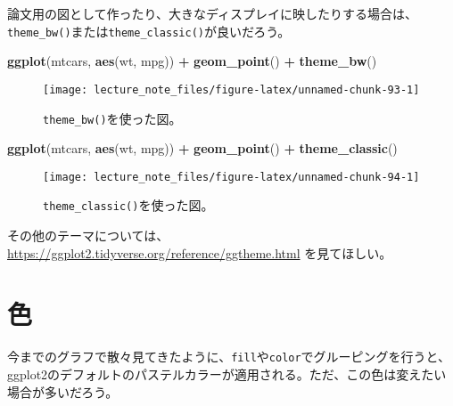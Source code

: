 \documentclass[]{book}
\newenvironment{Shaded}{\begin{snugshade}}{\end{snugshade}}
\newcommand{\KeywordTok}[1]{\textcolor[rgb]{0.13,0.29,0.53}{\textbf{#1}}}
\newcommand{\StringTok}[1]{\textcolor[rgb]{0.31,0.60,0.02}{#1}}
\newcommand{\OperatorTok}[1]{\textcolor[rgb]{0.81,0.36,0.00}{\textbf{#1}}}
\newcommand{\NormalTok}[1]{#1}
\begin{document}
論文用の図として作ったり、大きなディスプレイに映したりする場合は、\texttt{theme\_bw()}または\texttt{theme\_classic()}が良いだろう。



\begin{Shaded}
\begin{Highlighting}[]
\KeywordTok{ggplot}\NormalTok{(mtcars, }\KeywordTok{aes}\NormalTok{(wt, mpg)) }\OperatorTok{+}
\StringTok{  }\KeywordTok{geom_point}\NormalTok{() }\OperatorTok{+}
\StringTok{  }\KeywordTok{theme_bw}\NormalTok{()}
\end{Highlighting}
\end{Shaded}

\begin{figure}

{\centering \texttt{[image: lecture\_note\_files/figure-latex/unnamed-chunk-93-1]} 

}

\caption{\texttt{theme\_bw()}を使った図。}\label{fig:unnamed-chunk-93}
\end{figure}



\begin{Shaded}
\begin{Highlighting}[]
\KeywordTok{ggplot}\NormalTok{(mtcars, }\KeywordTok{aes}\NormalTok{(wt, mpg)) }\OperatorTok{+}
\StringTok{  }\KeywordTok{geom_point}\NormalTok{() }\OperatorTok{+}
\StringTok{  }\KeywordTok{theme_classic}\NormalTok{()}
\end{Highlighting}
\end{Shaded}

\begin{figure}

{\centering \texttt{[image: lecture\_note\_files/figure-latex/unnamed-chunk-94-1]} 

}

\caption{\texttt{theme\_classic()}を使った図。}\label{fig:unnamed-chunk-94}
\end{figure}

その他のテーマについては、\url{https://ggplot2.tidyverse.org/reference/ggtheme.html}
を見てほしい。

\section{色}

今までのグラフで散々見てきたように、\texttt{fill}や\texttt{color}でグルーピングを行うと、ggplot2のデフォルトのパステルカラーが適用される。ただ、この色は変えたい場合が多いだろう。
\end{document}
